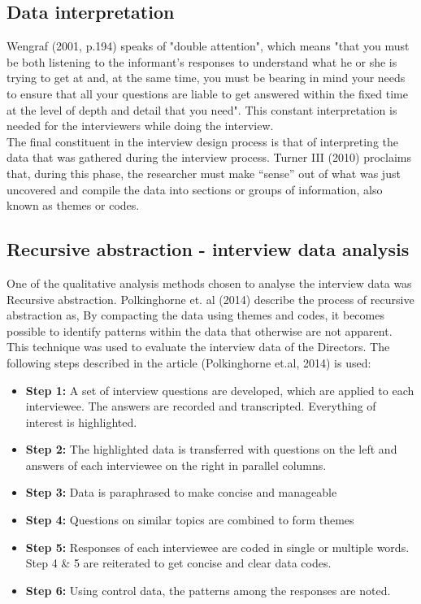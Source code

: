 \subsection{Data interpretation}
Wengraf (2001, p.194) speaks of "double attention", which means "that you must be both listening to the informant's responses to understand what he or she is trying to get at and, at the same time, you must be bearing in mind your needs to ensure that all your questions are liable to get answered within the fixed time at the level of depth and detail that you need". This constant interpretation is needed for the interviewers while doing the interview. \\ 

The final constituent in the interview design process is that of interpreting the data that was gathered during the interview process. Turner III (2010) proclaims that, during this phase, the researcher must make “sense” out of what was just uncovered and compile the data into sections or groups of information, also known as themes or codes.\\

\subsection{Recursive abstraction - interview data analysis}
One of the qualitative analysis methods chosen to analyse the interview data was Recursive abstraction. Polkinghorne et. al (2014) describe the process of recursive abstraction as, By compacting the data using themes and codes, it becomes possible to identify patterns within the data that otherwise are not apparent. This technique was used to evaluate the interview data of the Directors. The following steps described in the article (Polkinghorne et.al, 2014) is used:\\

\begin{itemize}
    \item \textbf{Step 1:}
    A set of interview questions are developed, which are applied to each interviewee. The answers are recorded and transcripted. Everything of interest is highlighted.\\
    \item \textbf{Step 2:}
    The highlighted data is transferred with questions on the left and answers of each interviewee on the right in parallel columns.\\
    \item \textbf{Step 3:}
    Data is paraphrased to make concise and manageable\\
    \item \textbf{Step 4:}
    Questions on similar topics are combined to form themes\\
    \item \textbf{Step 5:}
    Responses of each interviewee are coded in single or multiple words. Step 4 & 5 are reiterated to get concise and clear data codes.\\
    \item \textbf{Step 6:}
    Using control data, the patterns among the responses are noted. \\
\end{itemize}

